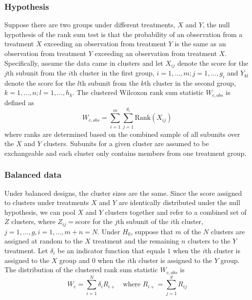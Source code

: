 \documentclass[nojss]{jss}\usepackage[]{graphicx}\usepackage[]{color}
\begin{document}
\subsubsection{Hypothesis}
\label{hrank}
Suppose there are two groups under different treatments,
$X$ and $Y$, the null hypothesis of the rank sum test
is that the probability of an observation from a
treatment $X$ exceeding an observation from treatment
$Y$ is the same as an observation from treatment $Y$
exceeding an observation from treatment $X$.
Specifically,
assume the data came in clusters and
let $X_{ij}$ denote the score for the $j$th subunit
from the $i$th cluster in the first group,
$i = 1,\ldots,m; j = 1,\ldots,g_i$ and $Y_{kl}$
denote the score for the $l$th subunit from
the $k$th cluster in the second group,
$k=1, \ldots,n;l=1,\ldots,h_k$.
The clustered Wilcoxon rank sum statistic
$W_{c,obs}$ is defined as
\begin{equation} \label{eq:Wco}
W_{c,obs} = \sum_{i=1}^m\sum_{j=1}^{g_i}\text{Rank}(X_{ij})
\end{equation}
where ranks are determined based on the
combined sample of all subunits over the
$X$ and $Y$ clusters. Subunits
for a given cluster are assumed to be exchangeable and each
cluster only contains members from one treatment group.


\subsubsection{Balanced data}\label{brank}
Under balanced designs, the cluster sizes are the same.
Since the score assigned to clusters under treatments
$X$ and $Y$ are
identically distributed under the null hypothesis,
we can pool $X$ and $Y$ clusters together and refer
to a combined set of $Z$ clusters, where $Z_{ij} = $score
for the $j$th subunit of the $i$th cluster,
$j = 1,\ldots,g, i=1,\ldots, m+n = N$.
Under $H_0$,
suppose that $m$ of the $N$ clusters are assigned
at random to the $X$ treatment and the remaining $n$
clusters to the $Y$ treatment.
Let $\delta_i$ be
an indicator function that equals $1$ when the $i$th cluster
is assigned to the $X$ group and $0$ when the $i$th cluster
is assigned to the $Y$ group.
The distribution of the clustered rank sum statistic $W_{c,obs}$ is
\begin{equation}\label{eq:Wc}
W_c = \sum^N_{i=1}\delta_iR_{i+} \quad \text{where   }R_{i+} = \sum^g_{j=1}R_{ij}
\end{equation}
\end{document}
